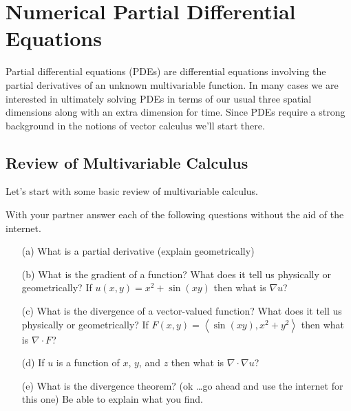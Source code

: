\chapter{Numerical Partial Differential Equations}
Partial differential equations (PDEs) are differential equations involving the partial
derivatives of an unknown multivariable function.  In many cases we are interested in
ultimately solving PDEs in terms of our usual three spatial dimensions along with an extra
dimension for time.  Since PDEs require a strong background in the notions of vector
calculus we'll start there.

\section{Review of Multivariable Calculus}
Let's start with some basic review of multivariable calculus.
\begin{problem}
    With your partner answer each of the following questions without the aid of the
    internet.
    \begin{enumerate}
        \item[(a)] What is a partial derivative (explain geometrically)
        \item[(b)] What is the gradient of a function? What does it tell us physically or geometrically? If
            $u(x,y)=x^2+\sin(xy)$ then what is $\nabla u$?
        \item[(c)] What is the divergence of a vector-valued function? What does it tell
            us physically or geometrically? If $F(x,y)=\left< \sin(xy), x^2+y^2\right>$
            then what is $\nabla \cdot F$?
        \item[(d)] If $u$ is a function of $x$, $y$, and $z$ then what is $\nabla \cdot
            \nabla u$?
        \item[(e)] What is the divergence theorem? (ok \ldots go ahead and use the
            internet for this one) Be able to explain what you find. 
    \end{enumerate}
\end{problem}

